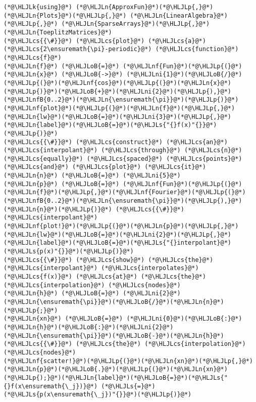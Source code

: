 \documentclass[12pt,landscape]{article}
\newcommand{\HLJLk}[1]{\textcolor[RGB]{148,91,176}{\textbf{#1}}}
\newcommand{\HLJLn}[1]{#1}
\newcommand{\HLJLnf}[1]{\textcolor[RGB]{66,102,213}{#1}}
\newcommand{\HLJLs}[1]{\textcolor[RGB]{201,61,57}{#1}}
\newcommand{\HLJLnfB}[1]{\textcolor[RGB]{59,151,46}{#1}}
\newcommand{\HLJLni}[1]{\textcolor[RGB]{59,151,46}{#1}}
\newcommand{\HLJLoB}[1]{\textcolor[RGB]{102,102,102}{\textbf{#1}}}
\newcommand{\HLJLp}[1]{#1}
\newcommand{\HLJLcs}[1]{\textcolor[RGB]{153,153,119}{\textit{#1}}}
\begin{document}
{\begin{lstlisting}
(*@\HLJLk{using}@*) (*@\HLJLn{ApproxFun}@*)(*@\HLJLp{,}@*) (*@\HLJLn{Plots}@*)(*@\HLJLp{,}@*) (*@\HLJLn{LinearAlgebra}@*)(*@\HLJLp{,}@*) (*@\HLJLn{SparseArrays}@*)(*@\HLJLp{,}@*) (*@\HLJLn{ToeplitzMatrices}@*)
(*@\HLJLcs{{\#}}@*) (*@\HLJLcs{plot}@*) (*@\HLJLcs{a}@*) (*@\HLJLcs{2\ensuremath{\pi}-periodic}@*) (*@\HLJLcs{function}@*) (*@\HLJLcs{f}@*)
(*@\HLJLn{f}@*) (*@\HLJLoB{=}@*) (*@\HLJLnf{Fun}@*)(*@\HLJLp{(}@*)(*@\HLJLn{x}@*) (*@\HLJLoB{->}@*) (*@\HLJLni{1}@*)(*@\HLJLoB{/}@*)(*@\HLJLp{(}@*)(*@\HLJLnf{cos}@*)(*@\HLJLp{(}@*)(*@\HLJLn{x}@*)(*@\HLJLp{)}@*)(*@\HLJLoB{+}@*)(*@\HLJLni{2}@*)(*@\HLJLp{),}@*)(*@\HLJLnfB{0..2}@*)(*@\HLJLn{\ensuremath{\pi}}@*)(*@\HLJLp{)}@*)
(*@\HLJLnf{plot}@*)(*@\HLJLp{(}@*)(*@\HLJLn{f}@*)(*@\HLJLp{,}@*)(*@\HLJLn{lw}@*)(*@\HLJLoB{=}@*)(*@\HLJLni{3}@*)(*@\HLJLp{,}@*)(*@\HLJLn{label}@*)(*@\HLJLoB{=}@*)(*@\HLJLs{"{}f(x)"{}}@*)(*@\HLJLp{)}@*)
(*@\HLJLcs{{\#}}@*) (*@\HLJLcs{construct}@*) (*@\HLJLcs{an}@*) (*@\HLJLcs{interpolant}@*) (*@\HLJLcs{through}@*) (*@\HLJLcs{n}@*) (*@\HLJLcs{equally}@*) (*@\HLJLcs{spaced}@*) (*@\HLJLcs{points}@*) (*@\HLJLcs{and}@*) (*@\HLJLcs{plot}@*) (*@\HLJLcs{it}@*)
(*@\HLJLn{n}@*) (*@\HLJLoB{=}@*) (*@\HLJLni{5}@*)
(*@\HLJLn{p}@*) (*@\HLJLoB{=}@*) (*@\HLJLnf{Fun}@*)(*@\HLJLp{(}@*)(*@\HLJLn{f}@*)(*@\HLJLp{,}@*)(*@\HLJLnf{Fourier}@*)(*@\HLJLp{(}@*)(*@\HLJLnfB{0..2}@*)(*@\HLJLn{\ensuremath{\pi}}@*)(*@\HLJLp{),}@*)(*@\HLJLn{n}@*)(*@\HLJLp{)}@*) (*@\HLJLcs{{\#}}@*) (*@\HLJLcs{interpolant}@*)
(*@\HLJLnf{plot!}@*)(*@\HLJLp{(}@*)(*@\HLJLn{p}@*)(*@\HLJLp{,}@*)(*@\HLJLn{lw}@*)(*@\HLJLoB{=}@*)(*@\HLJLni{2}@*)(*@\HLJLp{,}@*)(*@\HLJLn{label}@*)(*@\HLJLoB{=}@*)(*@\HLJLs{"{}interpolant}@*) (*@\HLJLs{p(x)"{}}@*)(*@\HLJLp{)}@*)
(*@\HLJLcs{{\#}}@*) (*@\HLJLcs{show}@*) (*@\HLJLcs{the}@*) (*@\HLJLcs{interpolant}@*) (*@\HLJLcs{interpolates}@*) (*@\HLJLcs{f(x)}@*) (*@\HLJLcs{at}@*) (*@\HLJLcs{the}@*) (*@\HLJLcs{interpolation}@*) (*@\HLJLcs{nodes}@*)
(*@\HLJLn{h}@*) (*@\HLJLoB{=}@*) (*@\HLJLni{2}@*)(*@\HLJLn{\ensuremath{\pi}}@*)(*@\HLJLoB{/}@*)(*@\HLJLn{n}@*)(*@\HLJLp{;}@*)
(*@\HLJLn{xn}@*) (*@\HLJLoB{=}@*) (*@\HLJLni{0}@*)(*@\HLJLoB{:}@*)(*@\HLJLn{h}@*)(*@\HLJLoB{:}@*)(*@\HLJLni{2}@*)(*@\HLJLn{\ensuremath{\pi}}@*)(*@\HLJLoB{-}@*)(*@\HLJLn{h}@*) (*@\HLJLcs{{\#}}@*) (*@\HLJLcs{the}@*) (*@\HLJLcs{interpolation}@*) (*@\HLJLcs{nodes}@*)
(*@\HLJLnf{scatter!}@*)(*@\HLJLp{(}@*)(*@\HLJLn{xn}@*)(*@\HLJLp{,}@*)(*@\HLJLn{p}@*)(*@\HLJLoB{.}@*)(*@\HLJLp{(}@*)(*@\HLJLn{xn}@*)(*@\HLJLp{);}@*)(*@\HLJLn{label}@*)(*@\HLJLoB{=}@*)(*@\HLJLs{"{}f(x\ensuremath{\_j})}@*) (*@\HLJLs{=}@*) (*@\HLJLs{p(x\ensuremath{\_j})"{}}@*)(*@\HLJLp{)}@*)
\end{lstlisting}

}
\end{document}
